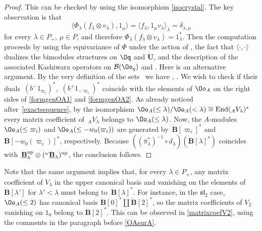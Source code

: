 \begin{proof} This can be checked by using the isomorphism \eqref{isocrystal}. The key observation is that
 \[\langle \Phi_\lambda(f_\lambda \otimes v_\lambda), 1_\mu\rangle = \langle f_\lambda , 1_\mu v_\lambda \rangle_\lambda = \delta_{\lambda,\mu}\]
 for every $\lambda\in P_+$, $\mu\in P$, and therefore $\Phi_\lambda(f_\lambda \otimes v_\lambda) = 1_\lambda^*$. Then the computation proceeds by using the equivariance of $\Phi$ under the action of , the fact that $\langle\cdot,\cdot \rangle$ dualizes the bimodules structures on $\Oq$ and $\dot{\mathbf{U}}$, and the description of the associated Kashiwara operators on $\mathcal{B}(\Oo_q)$ and . Here is an alternative argument. By the very definition of the sets~ we have , . We wish to check if their duals~$(b^-1_{\varpi_i})^*$,~$(b^+1_{-\varpi_i})^*$ coincide with the elements of $\Oo_A$ on the right sides of \eqref{formgenOA1} and \eqref{formgenOA2}. As already noticed after~\eqref{exactsequence}, by the isomorphism $\Oo_A(\leq \lambda)/\Oo_A(<\lambda) \cong {\rm End}({}_AV_\lambda)^*$ every matrix coefficient of~${}_AV_\lambda$ belongs to $\Oo_A(\leq \lambda)$. Now, the $A$-modules $\Oo_A(\leq \varpi_i)$ and $\Oo_A(\leq -w_0(\varpi_i))$ are generated by~${\dot{\mathbf{B}}[\varpi_i]^*}$ and $\dot{\mathbf{B}} [-w_0(\varpi_i)]^*$, respectively. Because $((\bar{\pi}_{\lambda}^*)^{-1} \circ d_{\lambda})(\dot{\mathbf{B}} [\lambda]^*)$ coincides with~${\underline{\mathbf{B}}_{\lambda}^{\rm up} \otimes ({}^{\omega}\underline{\mathbf{B}}_{\lambda})^{\rm up}}$, the conclusion follows.
 \end{proof}

Note that the same argument implies that, for every $\lambda\in P_+$, any matrix coefficient of $V_\lambda$ in the upper canonical basis and vanishing on the elements of $\dot{\mathbf{B}} [\lambda']$ for $\lambda'<\lambda$ must belong to~$\dot{\mathbf{B}} [\lambda]^*$. For instance, in the ${\mathfrak{sl}_2}$ case, $\Oo_A(\leq 2)$ has canonical basis $\dot{\mathbf{B}} [0]^* \coprod \dot{\mathbf{B}} [2]^*$, so the matrix coefficients of $V_2$ vanishing on $1_0$ belong to $\dot{\mathbf{B}} [2]^*$. This can be observed in \eqref{matrixcoefV2}, using the comments in the paragraph before \eqref{OAsurA}.


